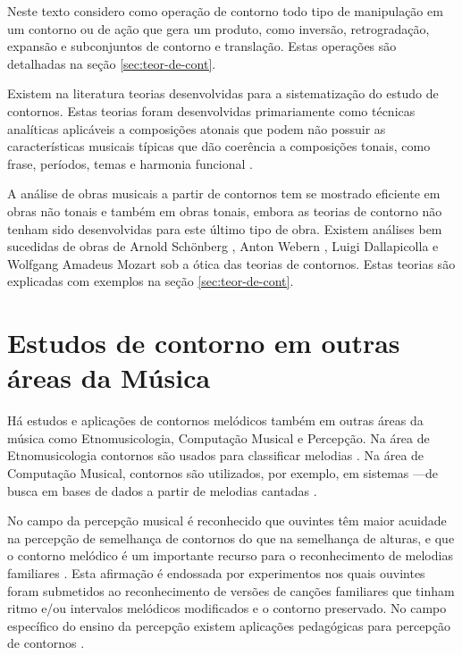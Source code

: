 Neste texto considero como operação de contorno todo tipo de
manipulação em um contorno ou de ação que gera um produto, como
inversão, retrogradação, expansão e subconjuntos de contorno e
translação. Estas operações são detalhadas na seção
\ref{sec:teor-de-cont}.

Existem na literatura teorias desenvolvidas para a sistematização do
estudo de contornos. Estas teorias foram desenvolvidas primariamente
como técnicas analíticas aplicáveis a composições atonais que podem
não possuir as características musicais típicas que dão coerência a
composições tonais, como frase, períodos, temas e harmonia funcional
\cite[p. 1]{beard03:contour}.

A análise de obras musicais a partir de contornos tem se mostrado
eficiente em obras não tonais e também em obras tonais, embora as
teorias de contorno não tenham sido desenvolvidas para este último
tipo de obra. Existem análises bem sucedidas de obras de Arnold
Schönberg \cite{friedmann85:methodology}, Anton Webern
\cite{clifford95:contour}, Luigi Dallapicolla
\cite{marvin88:generalized} e Wolfgang Amadeus Mozart
\cite{beard03:contour} sob a ótica das teorias de contornos. Estas
teorias são explicadas com exemplos na seção \ref{sec:teor-de-cont}.

\section{Estudos de contorno em outras áreas da Música}
\label{sec:estudos-de-contorno}

Há estudos e aplicações de contornos melódicos também em outras áreas
da música como Etnomusicologia, Computação Musical e Percepção. Na
área de Etnomusicologia contornos são usados para classificar melodias
\cite{adams76:melodic}. Na área de Computação Musical, contornos são
utilizados, por exemplo, em sistemas ---de busca
em bases de dados a partir de melodias cantadas
\cite{ghias.ea95:query}.

No campo da percepção musical é reconhecido que ouvintes têm maior
acuidade na percepção de semelhança de contornos do que na semelhança
de alturas, e que o contorno melódico é um importante recurso para o
reconhecimento de melodias familiares \cite[p. 226,
136]{dowling.ea86:music}. Esta afirmação é endossada por experimentos
\cite{white60:recognition,dowling.ea71:contour} nos quais ouvintes
foram submetidos ao reconhecimento de versões de canções familiares
que tinham ritmo e/ou intervalos melódicos modificados e o contorno
preservado. No campo específico do ensino da percepção existem
aplicações pedagógicas para percepção de contornos
\cite{marvin88:generalized,friedmann90:ear}.

